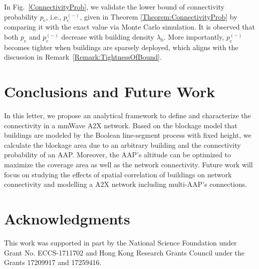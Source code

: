 \documentclass[12pt, draftclsnofoot, onecolumn]{IEEEtran}
\begin{document}
In Fig.~\ref{ConnectivityProb}, we validate the lower bound of connectivity probability $p_\mathrm{c}$, i.e., $p_\mathrm{c}^{(-)}$, given in Theorem \ref{Theorem:ConnectivityProb} by comparing it with the exact value via Monte Carlo simulation. It is observed that both $p_\mathrm{c}$ and $p_\mathrm{c}^{(-)}$ decrease with building density $\lambda_\mathrm{b}$. More importantly, $p_\mathrm{c}^{(-)}$ becomes tighter when buildings are sparsely deployed, which aligns with the discussion in Remark~\ref{Remark:TightnessOfBound}.


\section{Conclusions and Future Work}
In this letter, we propose an analytical framework to define and characterize the connectivity in a mmWave A2X network. Based on the blockage model that buildings are modeled by the Boolean line-segment process with fixed height, we calculate the blockage area due to an arbitrary building and the connectivity probability of an AAP. Moreover, the AAP's altitude can be optimized to maximize the coverage area as well as the network connectivity. Future work will focus on studying the effects of spatial correlation of buildings on network connectivity and modelling a A2X network including multi-AAP's connections.

\section{Acknowledgments}
This work was supported in part by the National Science Foundation under Grant No. ECCS-1711702 and Hong Kong Research Grants Council under the Grants 17209917 and 17259416.


\appendix
\end{document}
